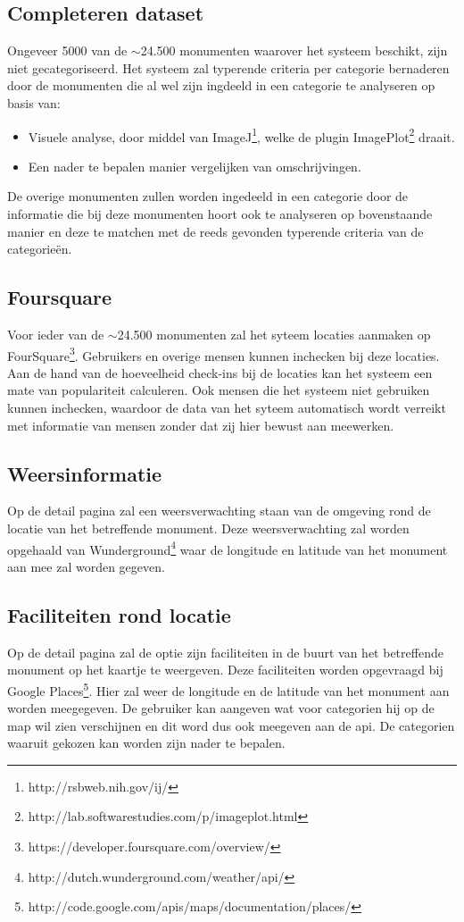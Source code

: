 \documentclass[a4paper,10pt]{article}
\begin{document}
			\subsection{Completeren dataset}
			Ongeveer 5000 van de $\sim$24.500 monumenten waarover het systeem beschikt, zijn niet gecategoriseerd. Het systeem zal typerende criteria per categorie bernaderen door de monumenten die al wel zijn ingdeeld in een categorie te analyseren op basis van:
				\begin{itemize}
					\item Visuele analyse, door middel van ImageJ\footnote{http://rsbweb.nih.gov/ij/}, welke de plugin ImagePlot\footnote{http://lab.softwarestudies.com/p/imageplot.html} draait.
					\item Een nader te bepalen manier vergelijken van omschrijvingen.
				\end{itemize}
			De overige monumenten zullen worden ingedeeld in een categorie door de informatie die bij deze monumenten hoort ook te analyseren op bovenstaande manier en deze te matchen met de reeds gevonden typerende criteria van de categorie\"en.
	
	        \subsection{Foursquare}
			Voor ieder van de $\sim$24.500 monumenten zal het syteem locaties aanmaken op FourSquare\footnote{https://developer.foursquare.com/overview/}. Gebruikers en overige mensen kunnen inchecken bij deze locaties. Aan de hand van de hoeveelheid check-ins bij de locaties kan het systeem een mate van populariteit calculeren. Ook mensen die het systeem niet gebruiken kunnen inchecken, waardoor de data van het syteem automatisch wordt verreikt met informatie van mensen zonder dat zij hier bewust aan meewerken.
				
			\subsection{Weersinformatie}
			Op de detail pagina zal een weersverwachting staan van de omgeving rond de locatie van het betreffende monument. Deze weersverwachting zal worden opgehaald van Wunderground\footnote{http://dutch.wunderground.com/weather/api/} waar de longitude en latitude van het monument aan mee zal worden gegeven.
				
			\subsection{Faciliteiten rond locatie}
			Op de detail pagina zal de optie zijn faciliteiten in de buurt van het betreffende monument op het kaartje te weergeven. Deze faciliteiten worden opgevraagd bij Google Places\footnote{http://code.google.com/apis/maps/documentation/places/}. Hier zal weer de longitude en de latitude van het monument aan worden meegegeven. De gebruiker kan aangeven wat voor categorien hij op de map wil zien verschijnen en dit word dus ook meegeven aan de api. De categorien waaruit gekozen kan worden zijn nader te bepalen.
				
\end{document}
